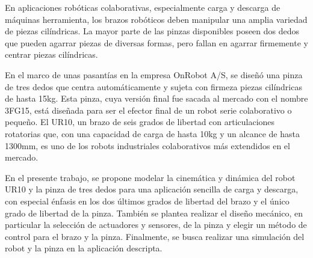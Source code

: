 \documentclass{article}
\newenvironment{standalone}{\begin{preview}}{\end{preview}}
\begin{document}
\begin{standalone}
  En aplicaciones robóticas colaborativas, especialmente carga y descarga de máquinas herramienta, los brazos robóticos deben manipular una amplia variedad de piezas cilíndricas.
  La mayor parte de las pinzas disponibles poseen dos dedos que pueden agarrar piezas de diversas formas, pero fallan en agarrar firmemente y centrar piezas cilíndricas.

  En el marco de unas pasantías en la empresa OnRobot A/S, se diseñó una pinza de tres dedos que centra automáticamente y sujeta con firmeza piezas cilíndricas de hasta 15kg.
  Esta pinza, cuya versión final fue sacada al mercado con el nombre 3FG15, está diseñada para ser el efector final de un robot serie colaborativo o pequeño.
  El UR10, un brazo de seis grados de libertad con articulaciones rotatorias que, con una capacidad de carga de hasta 10kg y un alcance de hasta 1300mm, es uno de los robots industriales colaborativos más extendidos en el mercado.

  En el presente trabajo, se propone modelar la cinemática y dinámica del robot UR10 y la pinza de tres dedos para una aplicación sencilla de carga y descarga, con especial énfasis en los dos últimos grados de libertad del brazo y el único grado de libertad de la pinza.
  También se plantea realizar el diseño mecánico, en particular la selección de actuadores y sensores, de la pinza y elegir un método de control para el brazo y la pinza.
  Finalmente, se busca realizar una simulación del robot y la pinza en la aplicación descripta.
\end{standalone}
\end{document}
